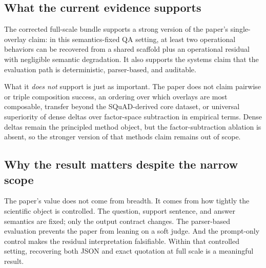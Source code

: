 \subsection{What the current evidence supports}

The corrected full-scale bundle supports a strong version of the paper's single-overlay claim: in this semantics-fixed QA setting, at least two operational behaviors can be recovered from a shared scaffold plus an operational residual with negligible semantic degradation. It also supports the systems claim that the evaluation path is deterministic, parser-based, and auditable.

What it \emph{does not} support is just as important. The paper does not claim pairwise or triple composition success, an ordering over which overlays are most composable, transfer beyond the SQuAD-derived core dataset, or universal superiority of dense deltas over factor-space subtraction in empirical terms. Dense deltas remain the principled method object, but the factor-subtraction ablation is absent, so the stronger version of that methods claim remains out of scope.

\subsection{Why the result matters despite the narrow scope}

The paper's value does not come from breadth. It comes from how tightly the scientific object is controlled. The question, support sentence, and answer semantics are fixed; only the output contract changes. The parser-based evaluation prevents the paper from leaning on a soft judge. And the prompt-only control makes the residual interpretation falsifiable. Within that controlled setting, recovering both JSON and exact quotation at full scale is a meaningful result.
